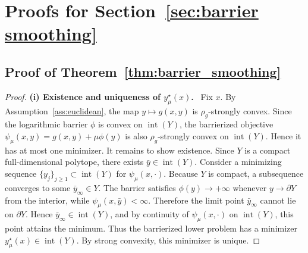 \documentclass{article}
\newcommand{\proofstep}[1]{\par\smallskip\noindent\textbf{#1}\ }
\begin{document}
\section{Proofs for Section~\ref{sec:barrier smoothing}}
\label{app:barrier_setup}

\subsection{Proof of Theorem~\ref{thm:barrier_smoothing}}
\label{app:proof_barrier_smoothing}

\begin{proof}
\proofstep{(i) Existence and uniqueness of \(y_\mu^\star(x)\).}
Fix \(x\). By Assumption~\ref{ass:euclidean}, the map \(y\mapsto g(x,y)\) is
\(\rho_g\)-strongly convex. Since the logarithmic barrier \(\phi\) is convex on
\(\operatorname{int}(Y)\), the barrierized objective
\(\psi_\mu(x,y)=g(x,y)+\mu\phi(y)\) is also \(\rho_g\)-strongly convex on
\(\operatorname{int}(Y)\). Hence it has at most one minimizer.
It remains to show existence. Since \(Y\) is a compact full-dimensional polytope, there exists
\(\bar y\in\operatorname{int}(Y)\). Consider a minimizing sequence
\(\{y_j\}_{j\ge1}\subset\operatorname{int}(Y)\) for \(\psi_\mu(x,\cdot)\). Because \(Y\) is compact,
a subsequence converges to some \(\bar y_\infty\in Y\). The barrier satisfies
\(\phi(y)\to+\infty\) whenever \(y\to\partial Y\) from the interior, while
\(\psi_\mu(x,\bar y)<\infty\). Therefore the limit point \(\bar y_\infty\) cannot lie on
\(\partial Y\). Hence \(\bar y_\infty\in\operatorname{int}(Y)\), and by continuity of
\(\psi_\mu(x,\cdot)\) on \(\operatorname{int}(Y)\), this point attains the minimum. Thus the
barrierized lower problem has a minimizer \(y_\mu^\star(x)\in\operatorname{int}(Y)\). By strong
convexity, this minimizer is unique.


\end{proof}
\end{document}
